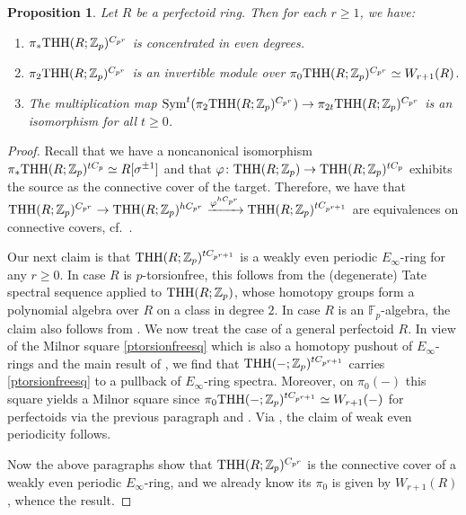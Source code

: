 \documentclass{amsart}
\newtheorem{proposition}[theorem]{Proposition}
\theoremstyle{definition}
\begin{document}
\begin{proposition}
\label{TRnperfectoid}
Let $R$ be a perfectoid ring. Then for each $r \geq 1$, we have: 
\begin{enumerate}
\item $\pi_{*} \mathrm{THH}(R; \mathbb{Z}_p)^{C_{p^r}}$ is concentrated in even degrees.  
\item $\pi_{2} \mathrm{THH}(R; \mathbb{Z}_p)^{C_{p^r}} $ is an invertible  module over 
$\pi_0 \mathrm{THH} (R; \mathbb{Z}_p)^{C_{p^r}} \simeq W_{r+1}(R)$. 
\item  The multiplication map 
$\mathrm{Sym}^t 
(\pi_{2} \mathrm{THH}(R; \mathbb{Z}_p)^{C_{p^r}}) \to \pi_{2t}\mathrm{THH}(R;
\mathbb{Z}_p)^{C_{p^r}}$ is an
isomorphism for all $t \geq 0$. 
\end{enumerate}
\end{proposition} 
\begin{proof} 
Recall \cite[Sec.~6]{BMS2} that we have a noncanonical isomorphism
$\pi_* \mathrm{THH}(R; \mathbb{Z}_p)^{tC_p} \simeq R[\sigma^{\pm 1}]$ and that 
$\varphi \colon \mathrm{THH}(R; \mathbb{Z}_p) \to \mathrm{THH}(R; \mathbb{Z}_p)^{tC_p}$ exhibits
the source as the connective cover of the target. 
Therefore, we have that 
$\mathrm{THH}(R; \mathbb{Z}_p)^{C_{p^r}} \to \mathrm{THH}(R; \mathbb{Z}_p)^{hC_{p^r}}
\xrightarrow{\varphi^{hC_{p^r}}}\mathrm{THH}(R; \mathbb{Z}_p)^{tC_{p^{r+1}}}$ are
equivalences on connective covers, cf.~\cite[Cor.~II.4.9]{NS18}. 



Our next claim is that 
$ \mathrm{THH}(R; \mathbb{Z}_p)^{tC_{p^{r+1}}}$ is a weakly even periodic 
$E_\infty$-ring for any $r \geq 0$. 
In case $R$ is $p$-torsionfree, this follows from the (degenerate) Tate spectral
sequence applied to $\mathrm{THH}(R; \mathbb{Z}_p)$, whose homotopy groups form a
polynomial algebra over $R$ on a class in degree $2$. 
In case $R$ is an $\mathbb{F}_p$-algebra, the claim also follows from
. 
We now treat the case of a general perfectoid $R$. 
In view of the Milnor square
\eqref{ptorsionfreesq} which is also a homotopy pushout of $E_\infty$-rings and
the main result of \cite{LT19}, we find that $\mathrm{THH}(-;
\mathbb{Z}_p)^{tC_{p^{r+1}}}$ carries
\eqref{ptorsionfreesq} to a pullback of $E_\infty$-ring spectra.  
Moreover, on $\pi_0(-)$ this square 
yields a Milnor square since $\pi_0 \mathrm{THH}(-; \mathbb{Z}_p)^{tC_{p^{r+1}}} \simeq
W_{r+1}(-)$ for perfectoids via the previous paragraph and \cite[Th.~F]{HM97}. 
Via , the claim of weak even 
periodicity follows. 

Now the above paragraphs show that 
$\mathrm{THH}(R; \mathbb{Z}_p)^{C_{p^r}}$ is the connective cover of a weakly even
periodic $E_\infty$-ring, and we already know its $\pi_0$ 
is given by $W_{r+1}(R)$, whence the result. 
\end{proof} 
\end{document}
